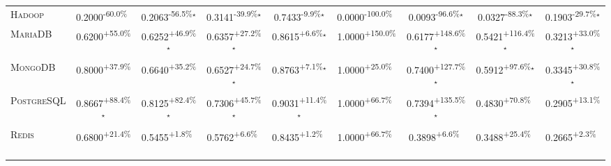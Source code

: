 \begin{table}[htbp]
\begin{tabular}{l|cccc|cccc}
\textsc{Hadoop} & \cellcolor{red!30}0.2000\textsuperscript{-60.0\%}$^{\,\,\,}$ & \cellcolor{red!30}0.2063\textsuperscript{-56.5\%}$^\star$ & \cellcolor{red!30}0.3141\textsuperscript{-39.9\%}$^\star$ & \cellcolor{red!30}0.7433\textsuperscript{-9.9\%}$^\star$ & \cellcolor{red!30}0.0000\textsuperscript{-100.0\%}$^{\,\,\,}$ & \cellcolor{red!30}0.0093\textsuperscript{-96.6\%}$^\star$ & \cellcolor{red!30}0.0327\textsuperscript{-88.3\%}$^\star$ & \cellcolor{red!30}0.1903\textsuperscript{-29.7\%}$^\star$ \\
\textsc{MariaDB} & \cellcolor{green!30}0.6200\textsuperscript{+55.0\%}$^{\,\,\,}$ & \cellcolor{green!30}0.6252\textsuperscript{+46.9\%}$^\star$ & \cellcolor{green!30}0.6357\textsuperscript{+27.2\%}$^\star$ & \cellcolor{green!30}0.8615\textsuperscript{+6.6\%}$^\star$ & \cellcolor{green!30}1.0000\textsuperscript{+150.0\%}$^{\,\,\,}$ & \cellcolor{green!30}0.6177\textsuperscript{+148.6\%}$^\star$ & \cellcolor{green!30}0.5421\textsuperscript{+116.4\%}$^\star$ & \cellcolor{green!30}0.3213\textsuperscript{+33.0\%}$^\star$ \\
\textsc{MongoDB} & \cellcolor{green!30}0.8000\textsuperscript{+37.9\%}$^{\,\,\,}$ & \cellcolor{green!30}0.6640\textsuperscript{+35.2\%}$^{\,\,\,}$ & \cellcolor{green!30}0.6527\textsuperscript{+24.7\%}$^\star$ & \cellcolor{green!30}0.8763\textsuperscript{+7.1\%}$^\star$ & \cellcolor{green!30}1.0000\textsuperscript{+25.0\%}$^{\,\,\,}$ & \cellcolor{green!30}0.7400\textsuperscript{+127.7\%}$^\star$ & \cellcolor{green!30}0.5912\textsuperscript{+97.6\%}$^\star$ & \cellcolor{green!30}0.3345\textsuperscript{+30.8\%}$^\star$ \\
\textsc{PostgreSQL} & \cellcolor{green!30}0.8667\textsuperscript{+88.4\%}$^\star$ & \cellcolor{green!30}0.8125\textsuperscript{+82.4\%}$^\star$ & \cellcolor{green!30}0.7306\textsuperscript{+45.7\%}$^\star$ & \cellcolor{green!30}0.9031\textsuperscript{+11.4\%}$^\star$ & \cellcolor{green!30}1.0000\textsuperscript{+66.7\%}$^{\,\,\,}$ & \cellcolor{green!30}0.7394\textsuperscript{+135.5\%}$^\star$ & \cellcolor{green!30}0.4830\textsuperscript{+70.8\%}$^{\,\,\,}$ & \cellcolor{green!30}0.2905\textsuperscript{+13.1\%}$^{\,\,\,}$ \\
\textsc{Redis} & \cellcolor{green!30}0.6800\textsuperscript{+21.4\%}$^{\,\,\,}$ & \cellcolor{green!30}0.5455\textsuperscript{+1.8\%}$^{\,\,\,}$ & \cellcolor{green!30}0.5762\textsuperscript{+6.6\%}$^{\,\,\,}$ & \cellcolor{green!30}0.8435\textsuperscript{+1.2\%}$^{\,\,\,}$ & \cellcolor{green!30}1.0000\textsuperscript{+66.7\%}$^{\,\,\,}$ & \cellcolor{green!30}0.3898\textsuperscript{+6.6\%}$^{\,\,\,}$ & \cellcolor{green!30}0.3488\textsuperscript{+25.4\%}$^{\,\,\,}$ & \cellcolor{green!30}0.2665\textsuperscript{+2.3\%}$^{\,\,\,}$ \\

\end{tabular}
\end{table}
